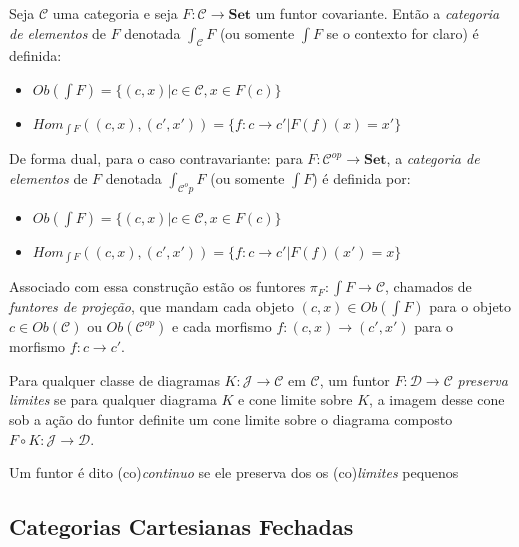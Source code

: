 \documentclass[../main.tex]{subfiles}
\begin{document}
\begin{definition}
    Seja $\mathcal{C}$ uma categoria e seja $F : \mathcal{C} \to \textbf{Set}$ um funtor covariante. Então a \emph{categoria de elementos} de $F$ denotada $\int_{\mathcal{C}} F$ (ou somente $\int F$ se o contexto for claro) é definida:
    \begin{itemize}
        \item $Ob(\int F) = \{(c, x) | c \in \mathcal{C}, x \in F(c)\}$
        \item $Hom_{\int F}((c,x), (c', x')) = \{f : c \to c' | F(f)(x) = x'\}$
    \end{itemize} 

    De forma dual, para o caso contravariante: para $F : \mathcal{C}^{op} \to \textbf{Set}$, a \emph{categoria de elementos} de $F$ denotada $\int_{\mathcal{C}^op} F$ (ou somente $\int F$) é definida por:
    \begin{itemize}
        \item $Ob(\int F) = \{(c, x) | c \in \mathcal{C}, x \in F(c)\}$
        \item $Hom_{\int F}((c,x), (c', x')) = \{f : c \to c' | F(f)(x') = x\}$
    \end{itemize} 
    Associado com essa construção estão os funtores $\pi_F : \int F \to \mathcal{C}$, chamados de \emph{funtores de projeção}, que mandam cada objeto $(c, x) \in Ob(\int F)$ para o objeto $c \in Ob(\mathcal{C})$ ou $Ob(\mathcal{C}^{op})$ e cada morfismo $f : (c, x) \to (c', x')$ para o morfismo $f : c \to c'$.
\end{definition}

\begin{definition}
    Para qualquer classe de diagramas $K : \mathcal{J} \to \mathcal{C}$ em $\mathcal{C}$, um funtor $F : \mathcal{D} \to \mathcal{C}$ \emph{preserva limites} se para qualquer diagrama $K$ e cone limite sobre $K$, a imagem desse cone sob a ação do funtor definite um cone limite sobre o diagrama composto $F \circ K : \mathcal{J} \to \mathcal{D}$.
\end{definition}


\begin{definition}
    Um funtor é dito (co)\emph{continuo} se ele preserva dos os (co)\emph{limites} pequenos
\end{definition}

\subsection{Categorias Cartesianas Fechadas}
\end{document}
